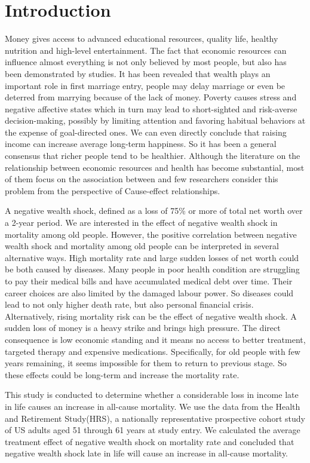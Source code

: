 \documentclass[aoas,preprint]{imsart}
\begin{document}
\section{Introduction}
Money gives access to advanced educational resources, quality life, healthy nutrition and high-level entertainment. The fact that economic resources can influence almost everything is not only believed by most people, but also has been demonstrated by studies. It has been revealed that wealth plays an important role in first marriage entry, people may delay marriage or even be deterred from marrying because of the lack of money\cite{r8,r5}. Poverty causes stress and negative affective states which in turn may lead to short-sighted and risk-averse decision-making, possibly by limiting attention and favoring habitual behaviors at the expense of goal-directed ones\cite{r6}. We can even directly conclude that raising income can increase average long-term happiness\cite{r7}. So it has been a general consensus that richer people tend to be healthier. Although the literature on the relationship between economic resources and health has become substantial, most of them focus on the association between and few researchers consider this problem from the perspective of Cause-effect relationships.

A negative wealth shock, defined as a loss of 75\% or more of total net worth over a 2-year period. We are interested in the effect of negative wealth shock in mortality among old people. However, the positive correlation between negative wealth shock and mortality among old people can be interpreted in several alternative ways. High mortality rate and large sudden losses of net worth could be both caused by diseases. Many people in poor health condition are struggling to pay their medical bills and have accumulated medical debt over time. Their career choices are also limited by the damaged labour power. So diseases could lead to not only higher death rate, but also personal financial crisis. Alternatively, rising mortality risk can be the effect of negative wealth shock. A sudden loss of money is a heavy strike and brings high pressure. The direct consequence is low economic standing and it means no access to better treatment, targeted therapy and expensive medications. Specifically, for old people with few years remaining, it seems impossible for them to return to previous stage. So these effects could be long-term and increase the mortality rate. 

This study is conducted to determine whether a considerable loss in income late in life causes an increase in all-cause mortality. We use the data from the Health and Retirement Study(HRS), a nationally representative prospective cohort study of US adults aged 51 through 61 years at study entry. We calculated the average treatment effect of negative wealth shock on mortality rate and concluded that negative wealth shock late in life will cause an increase in all-cause mortality.
\end{document}
